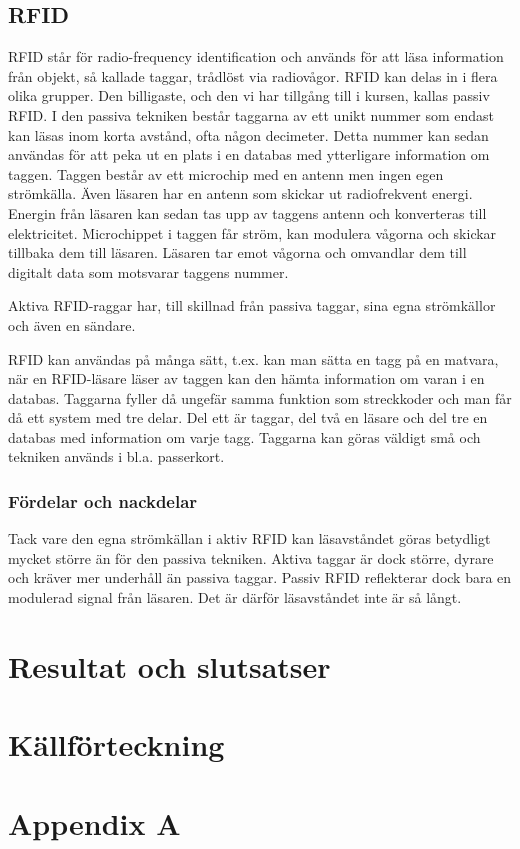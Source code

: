 \documentclass[a4paper,12pt,fleqn]{article}
\begin{document}
\subsection{RFID}
RFID står för radio-frequency identification och används för att läsa information från objekt, så kallade taggar, trådlöst via radiovågor. RFID kan delas in i flera olika grupper. Den billigaste, och den vi har tillgång till i kursen, kallas passiv RFID. I den passiva tekniken består taggarna av ett unikt nummer som endast kan läsas inom korta avstånd, ofta någon decimeter. Detta nummer kan sedan användas för att peka ut en plats i en databas med ytterligare information om taggen. Taggen består av ett microchip med en antenn men ingen egen strömkälla. Även läsaren har en antenn som skickar ut radiofrekvent energi. Energin från läsaren kan sedan tas upp av taggens antenn och konverteras till elektricitet. Microchippet i taggen får ström, kan modulera vågorna och skickar tillbaka dem till läsaren. Läsaren tar emot vågorna och omvandlar dem till digitalt data som motsvarar taggens nummer.

Aktiva RFID-raggar har, till skillnad från passiva taggar, sina egna strömkällor och även en sändare.

RFID kan användas på många sätt, t.ex. kan man sätta en tagg på en matvara, när en RFID-läsare läser av taggen kan den hämta information om varan i en databas. Taggarna fyller då ungefär samma funktion som streckkoder och man får då ett system med tre delar. Del ett är taggar, del två en läsare och del tre en databas med information om varje tagg. Taggarna kan göras väldigt små och tekniken används i bl.a. passerkort.

\subsubsection{Fördelar och nackdelar}
Tack vare den egna strömkällan i aktiv RFID kan läsavståndet göras betydligt mycket större än för den passiva tekniken. Aktiva taggar är dock större, dyrare och kräver mer underhåll än passiva taggar. Passiv RFID reflekterar dock bara en modulerad signal från läsaren. Det är därför läsavståndet inte är så långt.


\section{Resultat och slutsatser}

\section{Källförteckning}




\newpage
\appendix
\pagestyle{empty}
\section{Appendix A}
\end{document}
